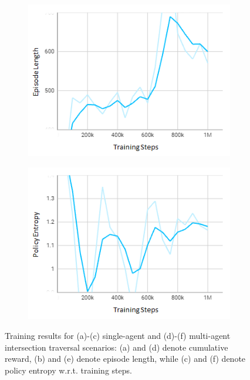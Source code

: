 \documentclass[letterpaper, 10 pt, conference]{ieeeconf}  %
\begin{document}
\begin{figure}[t]
\begin{subfigure}[b]{0.16\linewidth}
         \includegraphics[width=\linewidth]{Fig5e.png}
         \caption{}
         \label{fig5e}
     \end{subfigure}
     \hfill
     \begin{subfigure}[b]{0.16\linewidth}
         \centering
         \includegraphics[width=\linewidth]{Fig5f.png}
         \caption{}
         \label{fig5f}
     \end{subfigure}
     \caption{Training results for (a)-(c) single-agent and (d)-(f) multi-agent intersection traversal scenarios: (a) and (d) denote cumulative reward, (b) and (e) denote episode length, while (c) and (f) denote policy entropy w.r.t. training steps.}
    \label{fig5}
\end{figure}
\end{document}
